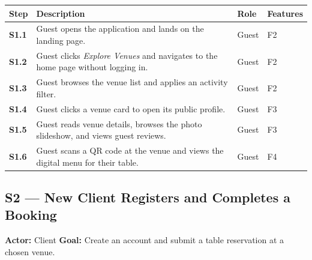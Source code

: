 \documentclass[12pt,a4paper]{article}
\begin{document}
\begin{longtable}{>{\bfseries}l L{6.5cm} l L{3cm}}
    \toprule
    Step & Description & Role & Features \\
    \midrule
    S1.1 & Guest opens the application and lands on the landing page. & Guest & F2 \\
    S1.2 & Guest clicks \emph{Explore Venues} and navigates to the home page
           without logging in. & Guest & F2 \\
    S1.3 & Guest browses the venue list and applies an activity filter. & Guest & F2 \\
    S1.4 & Guest clicks a venue card to open its public profile. & Guest & F3 \\
    S1.5 & Guest reads venue details, browses the photo slideshow, and views
           guest reviews. & Guest & F3 \\
    S1.6 & Guest scans a QR code at the venue and views the digital menu for
           their table. & Guest & F4 \\
    \bottomrule
\end{longtable}

\subsection*{S2 --- New Client Registers and Completes a Booking}
\begin{mdframed}[style=scenariobox]
\textbf{Actor:} Client \quad
\textbf{Goal:} Create an account and submit a table reservation at a
chosen venue.
\end{mdframed}
\end{document}
